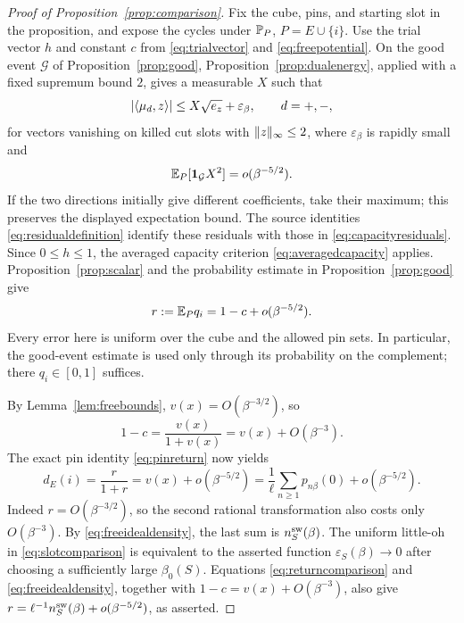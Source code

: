 \begin{proof}[Proof of Proposition~\ref{prop:comparison}]
Fix the cube, pins, and starting slot in the proposition, and expose
the cycles under $\mathbb P_P$, $P=E\cup\{i\}$.
Use the trial vector $h$ and constant $c$ from
\eqref{eq:trialvector} and \eqref{eq:freepotential}.
On the good event $\mathcal G$ of Proposition~\ref{prop:good},
Proposition~\ref{prop:dualenergy}, applied with a fixed supremum
bound $2$, gives a measurable $X$ such that
\[
 \lvert \langle \mu_d,z\rangle\rvert\le X\sqrt{e_z}+\varepsilon_\beta,
 \qquad d=+,-,
\]
for vectors vanishing on killed cut slots with
$\lVert z\rVert_\infty\le2$, where $\varepsilon_\beta$ is rapidly small
and
\[
 \mathbb E_P[\mathbf 1_{\mathcal G}X^2]=o(\beta^{-5/2}).
\]
If the two directions initially give different coefficients, take
their maximum; this preserves the displayed expectation bound.
The source identities \eqref{eq:residualdefinition} identify these
residuals with those in \eqref{eq:capacityresiduals}.
Since $0\le h\le1$, the averaged capacity criterion
\eqref{eq:averagedcapacity} applies.  Proposition~\ref{prop:scalar}
and the probability estimate in Proposition~\ref{prop:good} give
\begin{equation}\label{eq:returncomparison}
 r:=\mathbb E_Pq_i=1-c+o(\beta^{-5/2}).
\end{equation}
Every error here is uniform over the cube and the allowed pin sets.
In particular, the good-event estimate is used only through its
probability on the complement; there $q_i\in[0,1]$ suffices.

By Lemma~\ref{lem:freebounds}, $v(x)=O(\beta^{-3/2})$, so
\[
 1-c=\frac{v(x)}{1+v(x)}=v(x)+O(\beta^{-3}).
\]
The exact pin identity \eqref{eq:pinreturn} now yields
\begin{equation}\label{eq:slotcomparison}
 d_E(i)=\frac{r}{1+r}
       =v(x)+o(\beta^{-5/2})
       =\frac1\ell\sum_{n\ge1}p_{n\beta}(0)
          +o(\beta^{-5/2}).
\end{equation}
Indeed $r=O(\beta^{-3/2})$, so the second rational transformation
also costs only $O(\beta^{-3})$.
By \eqref{eq:freeidealdensity}, the last sum is
$n_S^{\rm sw}(\beta)$.  The uniform little-oh
in \eqref{eq:slotcomparison} is equivalent to the asserted function
$\varepsilon_S(\beta)\to0$ after choosing a sufficiently large
$\beta_0(S)$.  Equations \eqref{eq:returncomparison} and
\eqref{eq:freeidealdensity}, together with
$1-c=v(x)+O(\beta^{-3})$, also give
$r=\ell^{-1}n_S^{\rm sw}(\beta)+o(\beta^{-5/2})$, as asserted.
\end{proof}


